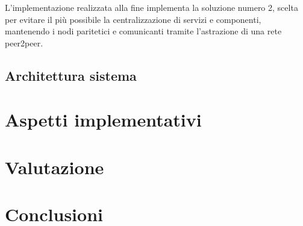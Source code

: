 \documentclass[10pt,a4paper]{article}
\begin{document}
L'implementazione realizzata alla fine implementa la soluzione numero 2, scelta per evitare il più possibile la centralizzazione di servizi e componenti, mantenendo i nodi paritetici e comunicanti tramite l'astrazione di una rete peer2peer. 

\subsection{Architettura sistema}

\section{Aspetti implementativi}

\section{Valutazione}

\section{Conclusioni}
\end{document}
